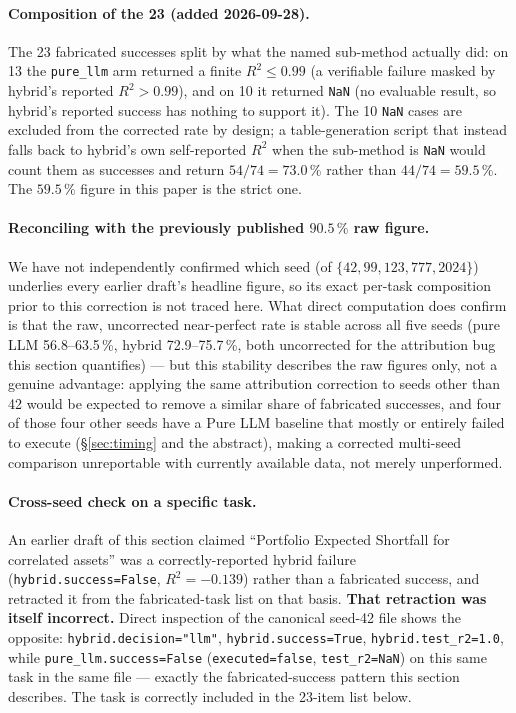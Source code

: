 \documentclass[twoside,11pt]{article}
\newcommand{\Rsq}{R^{2}}
\begin{document}
\paragraph{Composition of the 23 (added 2026-09-28).} The 23 fabricated
successes split by what the named sub-method actually did: on 13 the
\texttt{pure\_llm} arm returned a finite $\Rsq\le0.99$ (a verifiable
failure masked by hybrid's reported $\Rsq>0.99$), and on 10 it returned
\texttt{NaN} (no evaluable result, so hybrid's reported success has nothing to
support it). The 10 \texttt{NaN} cases are excluded from the corrected rate
by design; a table-generation script that instead falls back to hybrid's own
self-reported $\Rsq$ when the sub-method is \texttt{NaN} would count them as
successes and return $54/74=73.0\,\%$ rather than $44/74=59.5\,\%$. The
$59.5\,\%$ figure in this paper is the strict one.

\paragraph{Reconciling with the previously published $90.5\,\%$ raw
figure.} We have not independently confirmed which seed (of $\{42, 99,
123, 777, 2024\}$) underlies every earlier draft's headline figure, so
its exact per-task composition prior to this correction is not traced
here. What direct computation does confirm is that the raw, uncorrected
near-perfect rate is stable across all five seeds (pure LLM 56.8--63.5\,\%,
hybrid 72.9--75.7\,\%, both uncorrected for the attribution bug this
section quantifies) --- but this stability describes the raw figures
only, not a genuine advantage: applying the same attribution correction
to seeds other than 42 would be expected to remove a similar share of
fabricated successes, and four of those four other seeds have a Pure LLM
baseline that mostly or entirely failed to execute (\S\ref{sec:timing}
and the abstract), making a corrected multi-seed comparison unreportable
with currently available data, not merely unperformed.

\paragraph{Cross-seed check on a specific task.} An earlier draft of this
section claimed ``Portfolio Expected Shortfall for correlated assets''
was a correctly-reported hybrid failure (\texttt{hybrid.success=False},
$\Rsq=-0.139$) rather than a fabricated success, and retracted it from
the fabricated-task list on that basis. \textbf{That retraction was
itself incorrect.} Direct inspection of the canonical seed-42 file shows
the opposite: \texttt{hybrid.decision="llm"}, \texttt{hybrid.success=True},
\texttt{hybrid.test\_r2=1.0}, while \texttt{pure\_llm.success=False}
(\texttt{executed=false}, \texttt{test\_r2=NaN}) on this same task in the
same file --- exactly the fabricated-success pattern this section
describes. The task is correctly included in the 23-item list below.
\end{document}
